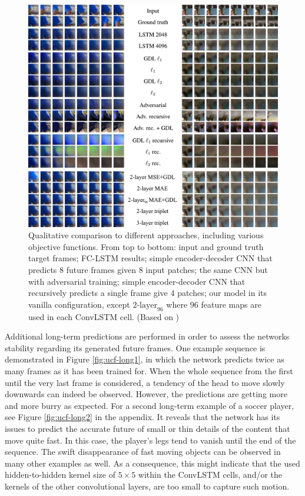 \begin{figure}[htpb]
	\centering
	\includegraphics[width=1.0\linewidth]{figures/pred/ucf/ucf_compare.png} 
	\caption[Qualitative Comparison to Competing Models]{Qualitative comparison to different approaches, including various objective functions. From top to bottom: input and ground truth target frames; FC-LSTM results; simple encoder-decoder CNN that predicts 8 future frames given 8 input patches; the same CNN but with adversarial training; simple encoder-decoder CNN that recursively predicts a single frame give 4 patches; our model in its vanilla configuration, except $\text{2-layer}_{96}$ where 96 feature maps are used in each ConvLSTM cell. (Based on \parencite[p. 13]{deep_multiscale_video_pred})} \label{fig:ucf-comparison}
\end{figure}

Additional long-term predictions are performed in order to assess the networks stability regarding its generated future frames. One example sequence is demonstrated in Figure \ref{fig:ucf-long1}, in which the network predicts twice as many frames as it has been trained for. When the whole sequence from the first until the very last frame is considered, a tendency of the head to move slowly downwards can indeed be observed. However, the predictions are getting more and more burry as expected. For a second long-term example of a soccer player, see Figure \ref{fig:ucf-long2} in the appendix. It reveals that the network has its issues to predict the accurate future of small or thin details of the content that move quite fast. In this case, the player's legs tend to vanish until the end of the sequence. The swift disappearance of fast moving objects can be observed in many other examples as well. As a consequence, this might indicate that the used hidden-to-hidden kernel size of $5 \times 5$ within the ConvLSTM cells, and/or the kernels of the other convolutional layers, are too small to capture such motion. 

